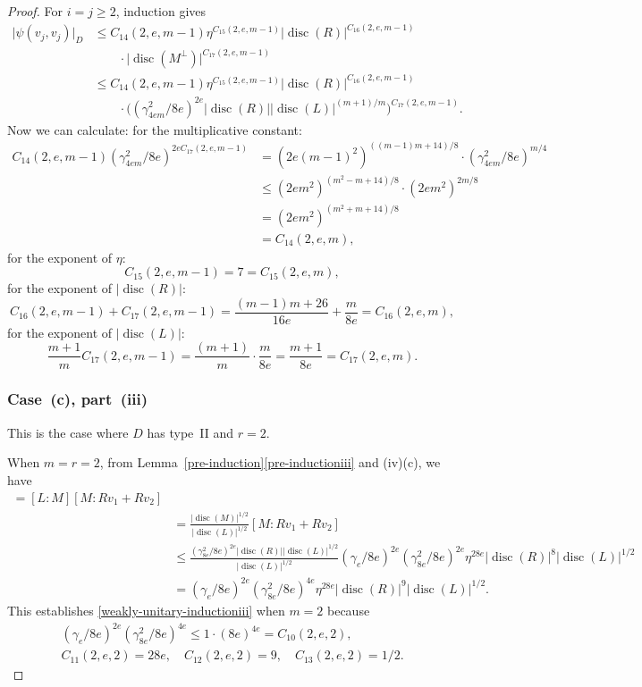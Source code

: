 \documentclass[JEP,XML,SOM,Unicode,NoFloatCountersInSection]{cedram}
\DeclareMathOperator{\disc}{disc}
\newcommand{\abs}[1]{\lvert #1 \rvert}
\begin{document}
\begin{proof}
For $i=j \geq 2$, induction gives
\begin{align*}
\abs{\psi(v_j, v_j)}_D
& \leq C_{14}(2,e,m-1) \eta^{C_{15}(2,e,m-1)} \abs{\disc(R)}^{C_{16} (2,e,m-1)}
\\& \qquad \cdot \abs{\disc(M^\perp)}^{C_{17}(2,e,m-1)}
\\& \leq C_{14}(2,e,m-1) \eta^{C_{15}(2,e,m-1)} \abs{\disc(R)}^{C_{16}(2,e,m-1)}
\\& \qquad \cdot \bigl( (\gamma_{4em}^2/8e)^{2e} \abs{\disc(R)} \abs{\disc(L)}^{(m+1)/m} \bigr)^{C_{17}(2,e,m-1)}.
\end{align*}
Now we can calculate:
for the multiplicative constant:
\begin{align*}
C_{14}(2,e,m-1) (\gamma_{4em}^2/8e)^{2eC_{17}(2,e,m-1)}
& = (2e(m-1)^2)^{((m-1)m+14)/8} \cdot (\gamma_{4em}^2/8e)^{m/4}
\\& \leq (2em^2)^{(m^2-m+14)/8} \cdot (2em^2)^{2m/8}
\\& = (2em^2)^{(m^2+m+14)/8}
\\& = C_{14}(2,e,m),
\end{align*}
for the exponent of $\eta$:
\[
C_{15}(2,e,m-1) = 7 = C_{15}(2,e,m),
\]
for the exponent of $\abs{\disc(R)}$:
\[
C_{16}(2,e,m-1) + C_{17}(2,e,m-1) = \frac{(m-1)m+26}{16e} + \frac{m}{8e}
= C_{16}(2, e, m),
\]
for the exponent of $\abs{\disc(L)}$:
\[
\frac{m+1}{m} C_{17}(2,e,m-1)= \frac{(m+1)}{m} \cdot \frac{m}{8e}
= \frac{m+1}{8e}
= C_{17}(2,e,m).
\]

\subsubsection*{Case~(c), part~(iii)}
This is the case where $D$ has type~II and $r=2$.

When $m=r=2$, from Lemma~\ref{pre-induction}\eqref{pre-inductioniii} and (iv)(c), we have
\begin{align*}
[L&:Rv_1 + Rv_2]
= [L:M][M:Rv_1 + Rv_2]
\\& = \frac{\abs{\disc(M)}^{1/2}}{\abs{\disc(L)}^{1/2}} [M:Rv_1 + Rv_2]
\\& \leq \frac{(\gamma_{8e}^2/8e)^{2e} \abs{\disc(R)} \abs{\disc(L)}^{1/2}}{\abs{\disc(L)}^{1/2}} (\gamma_e/8e)^{2e} (\gamma_{8e}^2/8e)^{2e} \eta^{28e} \abs{\disc(R)}^8 \abs{\disc(L)}^{1/2}
\\& = (\gamma_e/8e)^{2e} (\gamma_{8e}^2/8e)^{4e} \eta^{28e} \abs{\disc(R)}^9 \abs{\disc(L)}^{1/2}.
\end{align*}
This establishes \eqref{weakly-unitary-inductioniii} when $m=2$ because
\begin{gather*}
(\gamma_e/8e)^{2e} (\gamma_{8e}^2/8e)^{4e}
\leq 1 \cdot (8e)^{4e}
= C_{10}(2,e,2),
\\ C_{11}(2,e,2) = 28e,
\quad C_{12}(2,e,2) = 9,
\quad C_{13}(2,e,2) = 1/2.
\end{gather*}


\end{proof}
\end{document}
